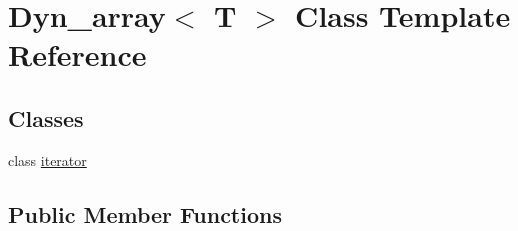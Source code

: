 \hypertarget{classDyn__array}{}\section{Dyn\+\_\+array$<$ T $>$ Class Template Reference}
\label{classDyn__array}
\subsection*{Classes}
\begin{DoxyCompactItemize}
\item 
class \hyperlink{classDyn__array_1_1iterator}{iterator}
\end{DoxyCompactItemize}
\subsection*{Public Member Functions}
